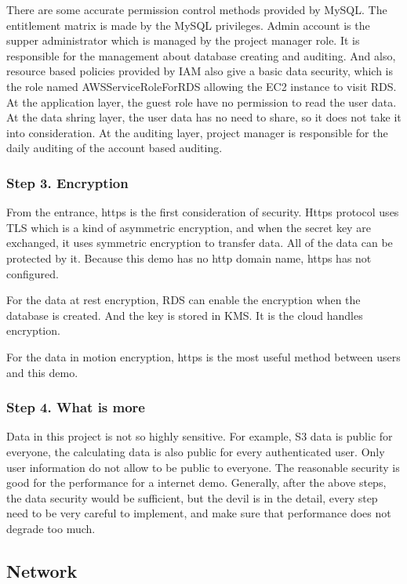 \documentclass[conference]{IEEEtran}
\begin{document}
There are some accurate permission control methods provided by MySQL. The entitlement matrix is made by the MySQL privileges. Admin account is the supper administrator 
which is managed by the project manager role. It is responsible for the management about database creating and auditing. And also, resource based policies provided 
by IAM also give a basic data security, which is the role named AWSServiceRoleForRDS allowing the EC2 instance to visit RDS. At the application layer, the guest role 
have no permission to read the user data. At the data shring layer, the user data has no need to share, so it does not take it into consideration. At the auditing layer, 
project manager is responsible for the daily auditing of the account based auditing.

\subsubsection{Step 3. Encryption}

From the entrance, https is the first consideration of security. Https protocol uses TLS which is a kind of asymmetric encryption, and when the secret key are exchanged, 
it uses symmetric encryption to transfer data. All of the data can be protected by it. Because this demo has no http domain name, https has not configured.

For the data at rest encryption, RDS can enable the encryption when the database is created. And the key is stored in KMS. It is the cloud handles encryption.

For the data in motion encryption, https is the most useful method between users and this demo.

\subsubsection{Step 4. What is more}

Data in this project is not so highly sensitive. For example, S3 data is public for everyone, the calculating data is also public for every authenticated user. Only user 
information do not allow to be public to everyone. The reasonable security is good for the performance for a internet demo. Generally, after the above steps, the data 
security would be sufficient, but the devil is in the detail, every step need to be very careful to implement, and make sure that performance does not degrade too much.

\subsection{Network}
\end{document}

